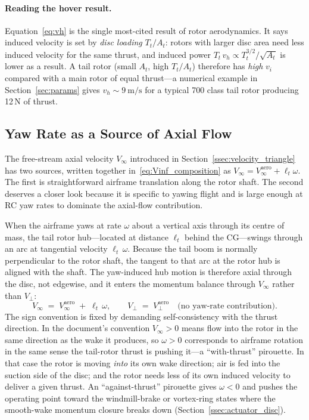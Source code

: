 \documentclass[11pt,a4paper]{article}
\newcommand{\At}{A_t}
\newcommand{\Tt}{T_t}
\newcommand{\vi}{v_i}
\begin{document}
\paragraph{Reading the hover result.}
Equation~\eqref{eq:vh} is the single most-cited result of rotor
aerodynamics. It says induced velocity is set by \emph{disc loading}
\(\Tt/\At\): rotors with larger disc area need less induced velocity for
the same thrust, and induced power \(\Tt\,v_h \propto \Tt^{3/2}/\sqrt{\At}\)
is lower as a result. A tail rotor (small \(\At\), high \(\Tt/\At\))
therefore has \emph{high} \(\vi\) compared with a main rotor of equal
thrust---a numerical example in Section~\ref{sec:params} gives
\(v_h\sim\SI{9}{\metre\per\second}\) for a typical 700 class tail rotor
producing 12\,N of thrust.

\subsection{Yaw Rate as a Source of Axial Flow}\label{ssec:yaw_rate_axial}

The free-stream axial velocity \(V_\infty\) introduced in
Section~\ref{ssec:velocity_triangle} has two sources, written together
in~\eqref{eq:Vinf_composition} as \(V_\infty=V_\infty^{\text{aero}}+\ell_t\omega\).
The first is straightforward airframe translation along the rotor
shaft. The second deserves a closer look because it is specific to
yawing flight and is large enough at RC yaw rates to dominate the
axial-flow contribution.

When the airframe yaws at rate \(\omega\) about a vertical axis
through its centre of mass, the tail rotor hub---located at distance
\(\ell_t\) behind the CG---swings through an arc at tangential
velocity \(\ell_t\,\omega\). Because the tail boom is normally
perpendicular to the rotor shaft, the tangent to that arc at the rotor
hub is aligned with the shaft. The yaw-induced hub motion is therefore
axial through the disc, not edgewise, and it enters the momentum
balance through \(V_\infty\) rather than \(V_\perp\):
\begin{equation}
V_\infty \;=\; V_\infty^{\text{aero}} \;+\; \ell_t\,\omega,
\qquad
V_\perp \;=\; V_\perp^{\text{aero}}
\quad\text{(no yaw-rate contribution).}
\label{eq:Vinf_yaw_decomposition}
\end{equation}
The sign convention is fixed by demanding self-consistency with the
thrust direction. In the document's convention \(V_\infty>0\) means flow
into the rotor in the same direction as the wake it produces, so
\(\omega>0\) corresponds to airframe rotation in the same sense the
tail-rotor thrust is pushing it---a ``with-thrust'' pirouette. In that
case the rotor is moving \emph{into} its own wake direction; air is fed
into the suction side of the disc; and the rotor needs less of its own
induced velocity to deliver a given thrust. An ``against-thrust''
pirouette gives \(\omega<0\) and pushes the operating point toward
the windmill-brake or vortex-ring states where the smooth-wake
momentum closure breaks down (Section~\ref{ssec:actuator_disc}).
\end{document}
